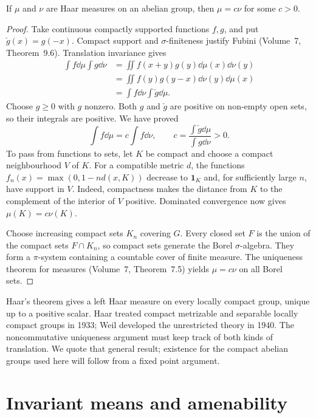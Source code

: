 \begin{theorem}[uniqueness]\label{thm:haaruniq}
If $\mu$ and $\nu$ are Haar measures on an abelian group, then $\mu=c\nu$ for some $c>0$.
\end{theorem}
\begin{proof}
Take continuous compactly supported functions $f,g$, and put $\check g(x)=g(-x)$. Compact support and $\sigma$-finiteness justify Fubini (Volume~7, Theorem~9.6). Translation invariance gives
\[\begin{aligned}
\int f\dd\mu\int g\dd\nu
 &=\iint f(x+y)g(y)\dd\mu(x)\dd\nu(y)\\
 &=\iint f(y)g(y-x)\dd\nu(y)\dd\mu(x)\\
 &=\int f\dd\nu\int\check g\dd\mu.
\end{aligned}\]
Choose $g\ge0$ with $g$ nonzero. Both $g$ and $\check g$ are positive on non-empty open sets, so their integrals are positive. We have proved
\[\int f\dd\mu=c\int f\dd\nu,\qquad c=\frac{\int\check g\dd\mu}{\int g\dd\nu}>0.
\]
To pass from functions to sets, let $K$ be compact and choose a compact neighbourhood $V$ of $K$. For a compatible metric $d$, the functions $f_n(x)=\max(0,1-nd(x,K))$ decrease to $\mathbf1_K$ and, for sufficiently large $n$, have support in $V$. Indeed, compactness makes the distance from $K$ to the complement of the interior of $V$ positive. Dominated convergence now gives $\mu(K)=c\nu(K)$.

Choose increasing compact sets $K_n$ covering $G$. Every closed set $F$ is the union of the compact sets $F\cap K_n$, so compact sets generate the Borel $\sigma$-algebra. They form a $\pi$-system containing a countable cover of finite measure. The uniqueness theorem for measures (Volume~7, Theorem~7.5) yields $\mu=c\nu$ on all Borel sets.
\end{proof}

\begin{remark}
Haar's theorem gives a left Haar measure on every locally compact group, unique up to a positive scalar. Haar treated compact metrizable and separable locally compact groups in 1933; Weil developed the unrestricted theory in 1940. The noncommutative uniqueness argument must keep track of both kinds of translation. We quote that general result; existence for the compact abelian groups used here will follow from a fixed point argument.
\end{remark}

\section{Invariant means and amenability}

